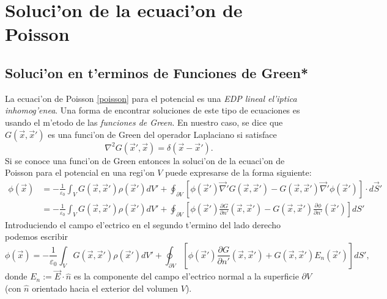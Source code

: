  \section{Soluci'on de la ecuaci'on de Poisson} 
 \subsection{Soluci'on en t'erminos de Funciones de Green*}
 La ecuaci'on de Poisson \eqref{poisson} para el potencial es una \textit{EDP lineal el'iptica inhomog'enea}. Una forma de encontrar soluciones de este tipo de ecuaciones es usando el m'etodo de las \textit{funciones de Green}. En nuestro caso, se dice que $G(\vec{x},\vec{x}')$ es una funci'on de Green del operador Laplaciano si satisface
\begin{equation}\label{EDPG}
\nabla^2G(\vec{x}',\vec{x})=\delta(\vec{x}-\vec{x}').
\end{equation} 
Si se conoce una funci'on de Green entonces la soluci'on de la ecuaci'on de Poisson para el potencial en una regi'on $V$ puede expresarse de la forma siguiente:
\begin{align}
\phi(\vec{x}) &= -\frac{1}{\varepsilon_0}\int_VG(\vec{x},\vec{x}')\rho(\vec{x}')dV'+\oint_{\partial V}\left[\phi(\vec{x}')\vec\nabla' G(\vec{x},\vec{x}')-G(\vec{x},\vec{x}')\vec\nabla'\phi(\vec{x}')\right]\cdot d\vec{S}' \\
&=  -\frac{1}{\varepsilon_0}\int_VG(\vec{x},\vec{x}') \rho(\vec{x}')dV'+\oint_{\partial V}\left[\phi(\vec{x}')\frac{\partial G}{\partial n'}(\vec{x},\vec{x}')-G(\vec{x},\vec{x}')\frac{\partial\phi}{\partial n'}(\vec{x}')\right]dS'
\end{align}
Introduciendo el campo el'ectrico en el segundo t'ermino del lado derecho podemos escribir
\begin{equation}\label{solPoisson}
\phi(\vec{x})= -\frac{1}{\varepsilon_0}\int_VG(\vec{x},\vec{x}') \rho(\vec{x}')dV'+\oint_{\partial V}\left[\phi(\vec{x}')\frac{\partial G}{\partial n'}(\vec{x},\vec{x}')+G(\vec{x},\vec{x}')E_n(\vec{x}')\right]dS',
\end{equation}
donde $E_n:=\vec{E}\cdot\hat{n}$ es la componente del campo el'ectrico normal a la superficie $\partial V$ (con $\hat{n}$ orientado hacia el exterior del volumen $V$).

